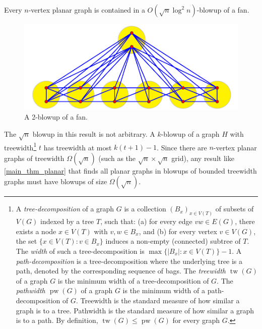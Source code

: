 \documentclass{patmorin}
\renewcommand{\leq}{\leqslant}
\newcommand{\david}[1]{{\color{orange} David: #1}}
\newcommand{\defin}[1]{\emph{\textcolor{brightmaroon}{#1}}}
\DeclareMathOperator{\tw}{tw}
\DeclareMathOperator{\pw}{pw}
\begin{document}
\begin{thm}\label{main_thm_planar}
  Every $n$-vertex planar graph is contained in a $O(\sqrt{n}\log^2 n)$-blowup of a fan.
\end{thm}

\begin{figure}[h]
   \includegraphics{figs/FanPartition}
    \caption{A 2-blowup of a fan.}
    \label{2blowup}
\end{figure}

The $\sqrt{n}$ blowup in this result is not arbitrary. A $k$-blowup of a graph $H$ with treewidth\footnote{A \defin{tree-decomposition} of a graph $G$ is a collection $(B_x)_{x \in V(T)}$ of subsets of $V(G)$ indexed by a tree $T$, such that: (a) for every edge ${vw \in E(G)}$, there exists a node ${x \in V(T)}$ with ${v,w \in B_x}$, and (b) for every vertex ${v \in V(G)}$, the set $\{ x \in V(T) \colon v \in B_x \}$ induces a non-empty (connected) subtree of $T$. The \defin{width} of such a tree-decomposition is ${\max\{ |B_x| \colon x \in V(T) \}-1}$. A \defin{path-decomposition} is a tree-decomposition where the underlying tree is a path, denoted by the corresponding sequence of bags. The \defin{treewidth $\tw(G)$} of a graph $G$ is the minimum width of a tree-decomposition of $G$. The \defin{pathwidth $\pw(G)$} of a graph $G$ is the minimum width of a path-decomposition of $G$. Treewidth is the standard measure of how similar a graph is to a tree. Pathwidth is the standard measure of how similar a graph is to a path. By definition, $\tw(G)\leq\pw(G)$ for every graph $G$.} $t$ has treewidth at most $k(t+1)-1$.  Since there are $n$-vertex planar graphs of treewidth $\Omega(\sqrt{n})$ (such as the $\sqrt{n}\times\sqrt{n}$ grid), any result like \cref{main_thm_planar} that finds all planar graphs in blowups of bounded treewidth graphs must have blowups of size $\Omega(\sqrt{n})$.


\end{document}
